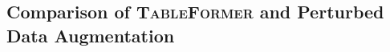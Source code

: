 \documentclass[11pt]{article}
\newcommand{\ag}[1]{{\color{blue} AG: #1}}
\begin{document}

\subsection{Comparison of \textsc{TableFormer} and Perturbed Data Augmentation}
\end{document}
